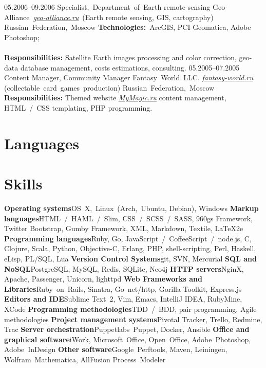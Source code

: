 \documentclass[12pt,a4paper,final]{moderncv}
\begin{document}
%
\cventry
{05.2006--09.2006}
{Specialist,~Department~of~Earth remote sensing}
{Geo-Alliance~\underline{\href{http://geo-alliance.ru}{\itshape geo-alliance.ru}}~(Earth remote sensing, GIS, cartography)}
{Russian~Federation,~Moscow}
{}
{
\textbf{Technologies:}~ArcGIS, PCI Geomatica, Adobe Photoshop;
\\\\
\textbf{Responsibilities:} Satellite Earth images processing and color correction, geo-data database management, costs estimations, consulting.
}
%
\cventry
{05.2005--07.2005}
{Content Manager, Community Manager}
{Fantasy~World~LLC. \underline{\href{http://fantasy-world.ru}{\itshape fantasy-world.ru}} (collectable~card~games~production)}
{Russian~Federation,~Moscow}
{}
{
  \textbf{Responsibilities:} Themed website \underline{\href{http://mymagic.ru}{\itshape MyMagic.ru}} content management, HTML~/~CSS templating, PHP programming.
}

\section{Languages}

\section{Skills}
\cvcomputer
{\textbf{Operating systems}}{OS~X,~Linux~(Arch,~Ubuntu, Debian), Windows}
{\textbf{Markup languages}}{HTML~/~HAML~/~Slim, CSS~/~SCSS~/~SASS, 960gs Framework, Twitter Bootstrap, Gumby Framework, XML, Markdown, Textile, \LaTeX2e}
%
\cvcomputer
{\textbf{Programming languages}}{Ruby, Go, JavaScript~/~CoffeeScript~/~node.js, C, Clojure, Scala, Python, Objective-C, Erlang, PHP, shell-scripting, Perl, Haskell, eLisp, PL/SQL, Lua}
{\textbf{Version Control Systems}}{git, SVN, Mercurial}
%
\cvcomputer
{\textbf{SQL and NoSQL}}{PostgreSQL, MySQL, Redis, SQLite, Neo4j}
{\textbf{HTTP servers}}{NginX, Apache, Passenger, Unicorn, lighttpd}
%
\cvcomputer
{\textbf{Web Frameworks and Libraries}}{Ruby~on~Rails, Sinatra, Go~net/http, Gorilla Toolkit, Express.js}
{\textbf{Editors and IDE}}{Sublime Text~2, Vim, Emacs, IntelliJ IDEA, RubyMine, XCode}
%
\cvcomputer
{\textbf{Programming methodologies}}{TDD~/~BDD, pair programming, Agile methodologies}
{\textbf{Project management systems}}{Pivotal Tracker, Trello, Redmine, Trac}
%
\cvcomputer
{\textbf{Server orchestration}}{Puppetlabs~Puppet, Docker, Ansible}
{\textbf{Office and graphical software}}{iWork, Microsoft~Office, Open~Office, Adobe~Photoshop, Adobe~InDesign}
%
\cvcomputer
{\textbf{Other software}}{Google~Perftools, Maven, Leiningen, Wolfram~Mathematica, AllFusion Process~Modeler}{}{}
\end{document}
